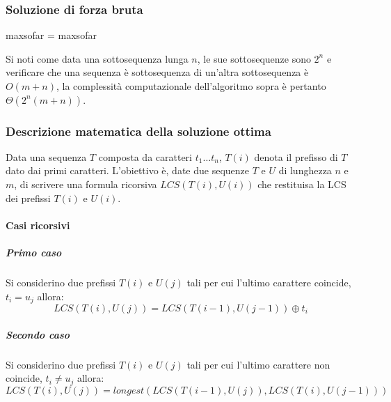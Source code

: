 \subsubsection{Soluzione di forza bruta}
\begin{algorithm}[H]
\DontPrintSemicolon
{}





\SetKwFunction{}{}
\SetKwFunction{}{}

\caption{\protect\Int \protect{}}
\Item[] maxsofar = \Nil\;
\Return maxsofar\;

\end{algorithm}
Si noti come data una sottosequenza lunga $n$, le sue sottosequenze sono $2^n$ e verificare che una sequenza \`e sottosequenza di un'altra sottosequenza
\`e $O(m+n)$, la complessit\`a computazionale dell'algoritmo sopra \`e pertanto $\Theta(2^n(m+n))$. 
\subsubsection{Descrizione matematica della soluzione ottima}
Data una sequenza $T$ composta da caratteri $t_1\dots t_n$, $T(i)$ denota il prefisso di $T$ dato dai primi caratteri. L'obiettivo \`e, date due sequenze
$T$ e $U$ di lunghezza $n$ e $m$, di scrivere una formula ricorsiva $LCS(T(i), U(i))$ che restituisa la LCS dei prefissi $T(i)$ e $U(i)$. 
\paragraph{Casi ricorsivi}
\subparagraph{Primo caso}
Si considerino due prefissi $T(i)$ e $U(j)$ tali per cui l'ultimo carattere coincide, $t_i = u_j$ allora: 
$$LCS(T(i), U(j)) = LCS(T(i - 1), U(j - 1))\oplus t_i$$
\subparagraph{Secondo caso}
Si considerino due prefissi $T(i)$ e $U(j)$ tali per cui l'ultimo carattere non coincide, $t_i \neq u_j$ allora: 
$$LCS(T(i), U(j)) = longest(LCS(T(i - 1), U(j)), LCS(T(i), U(j - 1)))$$
